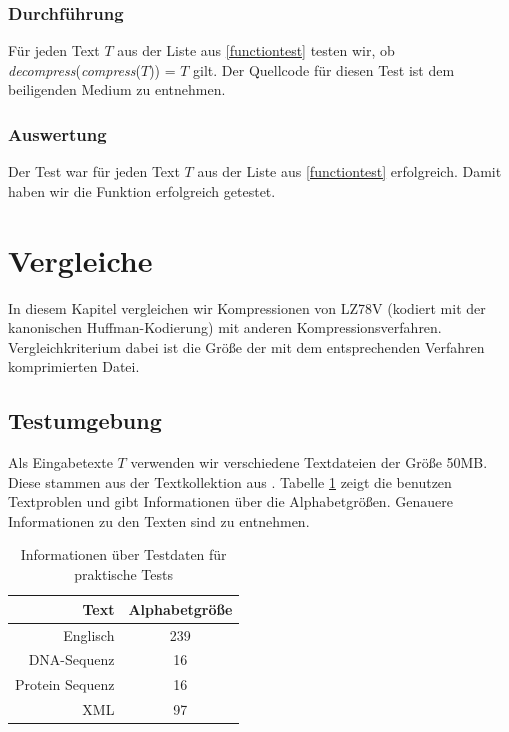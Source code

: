 \documentclass[a4paper,11pt]{scrartcl}%
\theoremstyle{change}
\theoremstyle{nonumberplain}
\theoremstyle{change}
\theoremstyle{nonumberplain}
\theoremstyle{change}
\theoremstyle{nonumberplain}
\begin{document}
\subsubsection{Durchführung}

Für jeden Text $T$ aus der Liste aus \autoref{functiontest} testen wir, ob \newline \textit{decompress}(\textit{compress}($T$)) = $T$ gilt.
Der Quellcode für diesen Test ist dem beiligenden Medium zu entnehmen.

\subsubsection{Auswertung}

Der Test war für jeden Text $T$ aus der Liste aus \autoref{functiontest} erfolgreich. Damit haben wir die Funktion erfolgreich getestet.


\section{Vergleiche}

In diesem Kapitel vergleichen wir Kompressionen von LZ78V (kodiert mit der kanonischen Huffman-Kodierung) mit anderen Kompressionsverfahren.
Vergleichkriterium dabei ist die Größe der mit dem entsprechenden Verfahren komprimierten Datei.

\subsection{Testumgebung}

Als Eingabetexte $T$ verwenden wir verschiedene Textdateien der Größe 50MB. Diese stammen aus der Textkollektion aus \cite{pizza}. Tabelle \ref{tbl:test_texts} zeigt die benutzen Textproblen und gibt Informationen über die Alphabetgrößen. Genauere Informationen zu den Texten sind \cite{pizza} zu entnehmen.

\begin{table}[h] 
	\begin{center}
		\begin{tabular}{|r|c|}\hline
			Text & Alphabetgröße  \\ \hline \hline
			Englisch & 239 \\ \hline
			DNA-Sequenz & 16 \\ \hline
			Protein Sequenz & 16 \\ \hline
			XML & 97 \\ \hline
		\end{tabular}
		\caption{Informationen über Testdaten für praktische Tests}
		\label{tbl:test_texts}
	\end{center}
\end{table}
\end{document}

